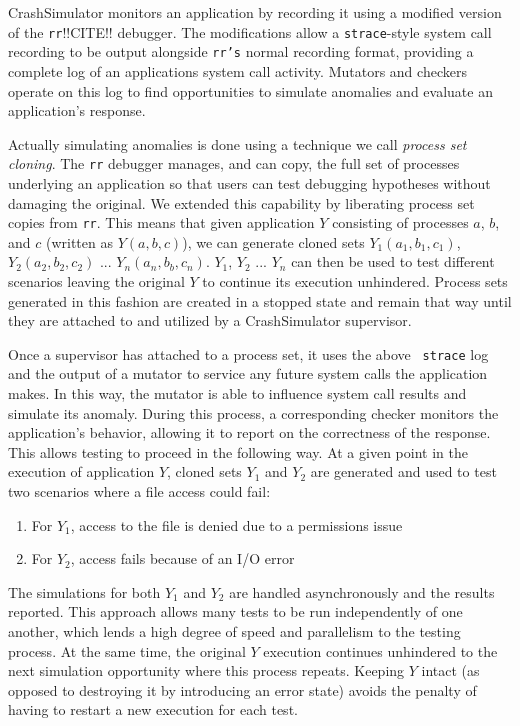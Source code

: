 CrashSimulator monitors an application by
recording it
using a modified version of the {\tt rr}!!CITE!!
debugger.
The modifications allow
a {\tt strace}-style
system call recording to be output alongside {\tt rr's} normal recording
format, providing
a complete log of an applications system call activity. Mutators and
checkers operate on this log to find opportunities to simulate
anomalies and evaluate an application's response.

Actually simulating anomalies
is done using
a technique
we call {\it process set cloning}.
The {\tt rr} debugger manages,
and can copy,
the full set of processes underlying an application
so that users can test debugging
hypotheses without damaging the original.
We extended this capability
by liberating process set copies from {\tt rr}.
This means that given application $Y$
consisting of processes $a$, $b$, and $c$
(written as $Y(a, b, c)$),
we can generate cloned sets $Y_1(a_1, b_1, c_1)$,
$Y_2(a_2, b_2, c_2)$ ... $Y_n(a_n, b_b, c_n)$.
$Y_1$, $Y_2$ ... $Y_n$ can then be used to test different scenarios leaving
the original $Y$ to continue its execution unhindered.
Process sets generated in this fashion are created in a stopped state and
remain that way until they are attached to and utilized by a CrashSimulator
supervisor.

Once a supervisor has attached to a process set, it uses the above {\tt
strace} log and the output of a mutator to service any future
system calls the application makes.  In this way, the mutator is able to
influence system call results and simulate its anomaly.
During this process,
a corresponding checker
monitors the application's behavior,
allowing it to report on the correctness of the response.
This allows testing to proceed in the following way.
At a given point in the execution of application $Y$,
cloned sets $Y_1$ and $Y_2$ are generated and
used to test two scenarios where a file access could fail:
\begin{enumerate}
    \item{For $Y_1$, access to the file is denied due to a permissions issue}
    \item{For $Y_2$, access fails because of an I/O error}
\end{enumerate}
The simulations for both $Y_1$ and $Y_2$ are handled asynchronously and
the results reported.
This approach allows many tests to be run independently of one another,
which lends a
high degree of speed and
parallelism to the testing process.
At the same time, the original $Y$ execution continues unhindered to the
next simulation opportunity where this process repeats.
Keeping $Y$ intact
(as opposed to destroying it by introducing an error state)
avoids the penalty
of having to restart a new execution for each test.
